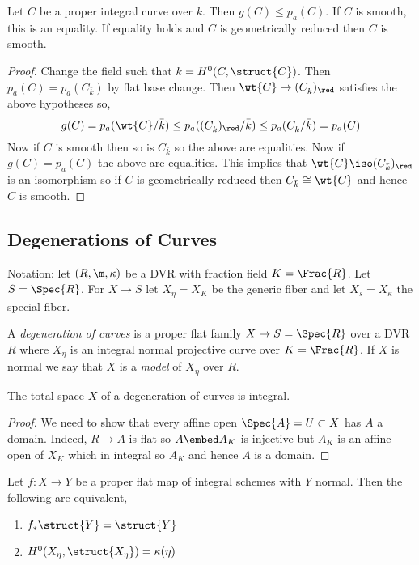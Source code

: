 \documentclass[12pt]{article}
\begin{document}
\begin{prop}
Let $C$ be a proper integral curve over $k$. Then $g(C) \le p_a(C)$. If $C$ is smooth, this is an equality. If equality holds and $C$ is geometrically reduced then $C$ is smooth.
\end{prop}

\begin{proof}
Change the field such that $k = H^0(C, \struct{C})$. Then $p_a(C) = p_a(C_{\bar{k}})$ by flat base change. Then $\wt{C} \to (C_{\bar{k}})_{\red}$ satisfies the above hypotheses so, 
\[ g(C) = p_a(\wt{C}/\bar{k}) \le p_a((C_{\bar{k}})_{\red} / \bar{k}) \le p_a(C_{\bar{k}}/\bar{k}) = p_a(C) \]
Now if $C$ is smooth then so is $C_{\bar{k}}$ so the above are equalities. Now if $g(C) = p_a(C)$ the above are equalities. This implies that $\wt{C} \iso (C_{\bar{k}})_{\red}$ is an  isomorphism so if $C$ is geometrically reduced then $C_{\bar{k}} \cong \wt{C}$ and hence $C$ is smooth. 
\end{proof}

\subsection{Degenerations of Curves}

Notation: let $(R, \m, \kappa)$ be a DVR with fraction field $K = \Frac{R}$. Let $S = \Spec{R}$. For $X \to S$ let $X_\eta = X_K$ be the generic fiber and let $X_s = X_\kappa$ the special fiber.

\begin{defn}
A \textit{degeneration of curves} is a proper flat family $X \to S = \Spec{R}$ over a DVR $R$ where $X_\eta$ is an integral normal projective curve over $K = \Frac{R}$. If $X$ is normal we say that $X$ is a \textit{model} of $X_\eta$ over $R$.
\end{defn}

\begin{lemma}
The total space $X$ of a degeneration of curves is integral.
\end{lemma}

\begin{proof}
We need to show that every affine open $\Spec{A} = U \subset X$ has $A$ a domain. Indeed, $R \to A$ is flat so $A \embed A_K$ is injective but $A_K$ is an affine open of $X_K$ which in integral so $A_K$ and hence $A$ is a domain.
\end{proof}

\begin{lemma} \label{lemma:normal_o_conn}
Let $f : X \to Y$ be a proper flat map of integral schemes with $Y$ normal. Then the following are equivalent,
\begin{enumerate}
\item $f_* \struct{Y} = \struct{Y}$
\item $H^0(X_\eta, \struct{X_\eta}) = \kappa(\eta)$
\end{enumerate}
\end{lemma}
\end{document}
